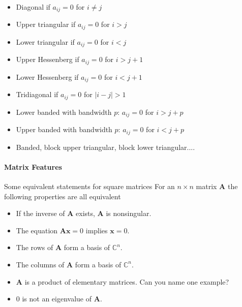 \begin{itemize}
  \item Diagonal if $a_{ij}=0$ for $i\ne j$

  \item Upper triangular if $a_{ij}=0$ for $i > j$

  \item Lower triangular if $a_{ij}=0$ for $i < j$

  \item Upper Hessenberg if $a_{ij}=0$ for $i > j+1$

  \item Lower Hessenberg if $a_{ij}=0$ for $i < j+1$

  \item Tridiagonal if $a_{ij}=0$ for $|i -j| > 1$

  \item Lower banded with bandwidth $p$: $a_{ij}=0$ for $i > j+p$

  \item Upper banded with bandwidth $p$: $a_{ij}=0$ for $i < j+p$

  \item Banded, block upper triangular, block lower triangular....
\end{itemize}



\paragraph{Matrix Features}

\begin{block}{Some equivalent statements for square matrices }
For an $n\times n$ matrix  $\bm{A}$ the following properties are all equivalent

\begin{itemize}
  \item If the inverse of $\bm{A}$ exists, $\bm{A}$ is nonsingular.

  \item The equation $\bm{Ax}=0$ implies $\bm{x}=0$.

  \item The rows of $\bm{A}$ form a basis of $\mathbb{C}^{n}$.

  \item The columns of $\bm{A}$ form a basis of $\mathbb{C}^{n}$.

  \item $\bm{A}$ is a product of elementary matrices. Can you name one example?

  \item $0$ is not an eigenvalue of $\bm{A}$.
\end{itemize}


\end{block}


